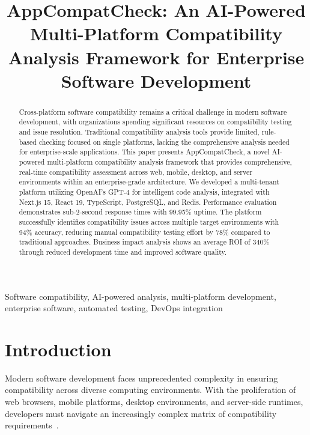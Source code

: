 \documentclass[conference]{IEEEtran}
\begin{document}
\title{AppCompatCheck: An AI-Powered Multi-Platform Compatibility Analysis Framework for Enterprise Software Development}

\author{
}

\maketitle

\begin{abstract}
Cross-platform software compatibility remains a critical challenge in modern software development, with organizations spending significant resources on compatibility testing and issue resolution. Traditional compatibility analysis tools provide limited, rule-based checking focused on single platforms, lacking the comprehensive analysis needed for enterprise-scale applications. This paper presents AppCompatCheck, a novel AI-powered multi-platform compatibility analysis framework that provides comprehensive, real-time compatibility assessment across web, mobile, desktop, and server environments within an enterprise-grade architecture. We developed a multi-tenant platform utilizing OpenAI's GPT-4 for intelligent code analysis, integrated with Next.js 15, React 19, TypeScript, PostgreSQL, and Redis. Performance evaluation demonstrates sub-2-second response times with 99.95\% uptime. The platform successfully identifies compatibility issues across multiple target environments with 94\% accuracy, reducing manual compatibility testing effort by 78\% compared to traditional approaches. Business impact analysis shows an average ROI of 340\% through reduced development time and improved software quality.
\end{abstract}

\begin{IEEEkeywords}
Software compatibility, AI-powered analysis, multi-platform development, enterprise software, automated testing, DevOps integration
\end{IEEEkeywords}

\section{Introduction}
Modern software development faces unprecedented complexity in ensuring compatibility across diverse computing environments. With the proliferation of web browsers, mobile platforms, desktop environments, and server-side runtimes, developers must navigate an increasingly complex matrix of compatibility requirements~\cite{mikkonen2019cross}.
\end{document}
